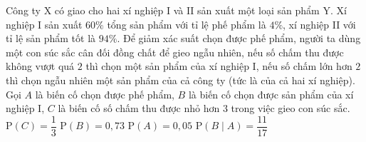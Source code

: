 \begin{ex}%
	Công ty X có giao cho hai xí nghiệp I và II sản xuất một loại sản phẩm Y. Xí nghiệp I sản xuất $60\%$ tổng sản phẩm với tỉ lệ phế phẩm là $4\%$, xí nghiệp II với tỉ lệ sản phẩm tốt là $94\%$. Để giảm xác suất chọn được phế phẩm, người ta dùng một con súc sắc cân đối đồng chất để gieo ngẫu nhiên, nếu số chấm thu được không vượt quá $2$ thì chọn một sản phẩm của xí nghiệp I, nếu số chấm lớn hơn $2$ thì chọn ngẫu nhiên một sản phẩm của cả công ty (tức là của cả hai xí nghiệp). Gọi $A$ là biến cố chọn được phế phẩm, $B$ là biến cố chọn được sản phẩm của xí nghiệp I, $C$ là biến cố số chấm thu được nhỏ hơn $3$ trong việc gieo con súc sắc.
	\choiceTF
	{\True $\mathrm{P}(C)=\dfrac{1}{3}$}
	{$\mathrm{P}(B)=0{,}73$}
	{$\mathrm{P}(A)=0{,}05$}
	{\True $\mathrm{P}(B\mid A)=\dfrac{11}{17}$}
\end{ex}
